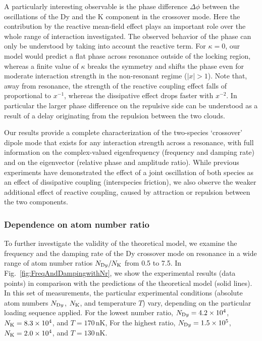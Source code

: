 {A particularly interesting observable is the phase difference $\Delta \phi$ between the oscillations of the Dy and the K component in the crossover mode.
Here the contribution by the reactive mean-field effect plays an important role over the whole range of interaction investigated. The observed behavior of the phase can only be understood by taking into account the reactive term. For $\kappa=0$, our model would predict a flat phase across resonance outside of the locking region, whereas a finite value of $\kappa$ breaks the symmetry and shifts the phase  even for moderate interaction strength in the non-resonant regime ($|x|>1$). Note that, away from resonance, the strength of the reactive coupling effect falls of proportional to $x^{-1}$, whereas the dissipative effect drops faster with $x^{-2}$.
In particular the larger phase difference on the repulsive side can be understood as a result of a delay originating from the repulsion between the two clouds.}

Our results provide a complete characterization of the two-species `crossover' dipole mode that exists for any interaction strength across a resonance, with full information on the complex-valued eigenfrequency (frequency and damping rate) and on the eigenvector (relative phase and amplitude ratio). 
While previous experiments \cite{Gensemer2001tfc, Ferlaino2003doi, Delehaye2015cva, Finelli2024ula} have demonstrated the
effect of a joint oscillation of both species as an effect of dissipative coupling (interspecies friction), 
we also observe the weaker additional effect of reactive coupling, caused by attraction or repulsion between the two components.

\subsubsection{Dependence on atom number ratio}

To further investigate the validity of the theoretical model, we examine the frequency and the damping rate of the Dy crossover mode on resonance in a wide range of atom number ratios $N_{\textrm Dy}/N_{\textrm K}$ from 0.5 to 7.5. In Fig.~\ref{fig:FreqAndDampingwithNr}, we show the experimental results (data points) in comparison with the predictions of the theoretical model (solid lines). 
In this set of measurements, the particular experimental conditions (absolute atom numbers $N_{\textrm Dy}$, $N_{\textrm K}$, and temperature $T$) vary, depending on the particular loading sequence applied. 
{For the lowest number ratio, %
$N_{\textrm Dy} = 4.2\times10^{4}$, $N_{\textrm K} = 8.3\times 10^4$, and $T = 170\,$nK,
For the highest ratio, %
$N_{\textrm Dy} = 1.5\times10^5$, $N_{\textrm K} = 2.0\times10^4$, and $T = 130\,$nK.}

